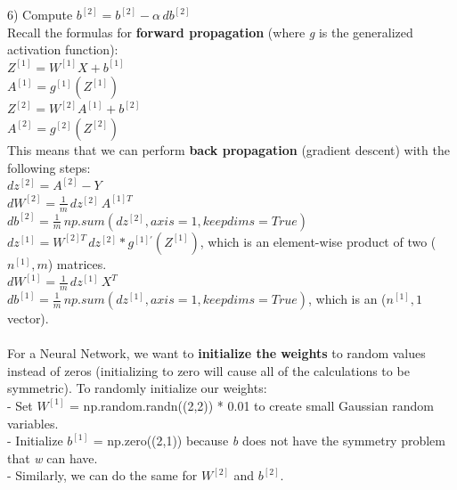 \documentclass[11pt, a4paper]{article}
\begin{document}
\begin{spacing}{1.1}
	\hspace*{8mm} 6) Compute $b^{[2]} = b^{[2]} - \alpha\, db^{[2]}$ \vspace*{2mm} \\
	Recall the formulas for \textbf{forward propagation} (where \textit{g} is the generalized activation function): \vspace*{.5mm} \\
	\hspace*{3mm} $Z^{[1]} = W^{[1]}X + b^{[1]}$  \vspace*{1mm} \\
	\hspace*{3mm} $A^{[1]} = g^{[1]}(Z^{[1]})$  \vspace*{1mm} \\
	\hspace*{3mm} $Z^{[2]} = W^{[2]}A^{[1]} + b^{[2]}$  \vspace*{1mm} \\
	\hspace*{3mm} $A^{[2]} = g^{[2]}(Z^{[2]})$ \vspace*{2mm} \\
	This means that we can perform \textbf{back propagation} (gradient descent) with the following steps: \vspace*{.5mm} \\
	\hspace*{3mm} $dz^{[2]} = A^{[2]} - Y$ \\
	\hspace*{3mm} $dW^{[2]} = \frac{1}{m}\, dz^{[2]}\,A^{[1]T}$\\
	\hspace*{3mm} $db^{[2]} = \frac{1}{m}\, np.sum(dz^{[2]}, axis=1, keepdims=True)$ \vspace*{.5mm} \\
	\hspace*{3mm} $dz^{[1]} = W^{[2]T}\,dz^{[2]} * g^{[1]'}(Z^{[1]})$, which is an element-wise product of two ($n^{[1]}, m$) matrices. \\
	\hspace*{3mm} $dW^{[1]} = \frac{1}{m}\, dz^{[1]}\,X^{T}$\\
	\hspace*{3mm} $db^{[1]} = \frac{1}{m}\, np.sum(dz^{[1]}, axis=1, keepdims=True)$, which is an ($n^{[1]},1$ vector). \\~\\
	For a Neural Network, we want to \textbf{initialize the weights} to random values instead of zeros (initializing to zero will cause all of the calculations to be symmetric). To randomly initialize our weights: \\ 
	\hspace*{3mm} - Set $W^{[1]}$ = np.random.randn((2,2)) * 0.01 to create small Gaussian random variables.\\ 
	\hspace*{3mm} - Initialize $b^{[1]}$ = np.zero((2,1)) because \textit{b} does not have the symmetry problem that \textit{w} can have. \\
	\hspace*{3mm} - Similarly, we can do the same for $W^{[2]}$ and $b^{[2]}$. 

\end{spacing}
\end{document}
